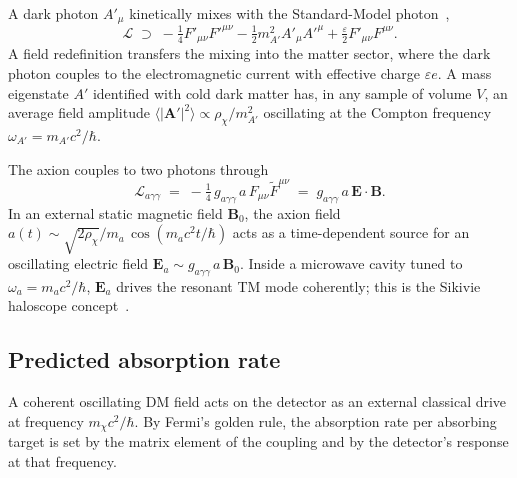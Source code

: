 \begin{statement}
\label{stmt:dark-photon}
A dark photon $A'_\mu$ kinetically mixes with the Standard-Model
photon~\cite{holdom1986},
\begin{equation}
\label{eq:dark-photon-L}
\mathcal{L}\;\supset\;-\tfrac{1}{4}F'_{\mu\nu}F'^{\mu\nu}-\tfrac12 m_{A'}^2 A'_\mu A'^\mu
+\tfrac{\varepsilon}{2}F'_{\mu\nu}F^{\mu\nu}.
\end{equation}
A field redefinition transfers the mixing into the matter sector,
where the dark photon couples to the electromagnetic current with
effective charge $\varepsilon e$. A mass eigenstate $A'$ identified
with cold dark matter has, in any sample of volume $V$, an average
field amplitude $\langle |\bm A'|^2\rangle\propto \rho_\chi/m_{A'}^2$
oscillating at the Compton frequency $\omega_{A'}=m_{A'}c^2/\hbar$.
\end{statement}

\begin{statement}
\label{stmt:axion}
The axion couples to two photons through
\begin{equation}
\label{eq:axion-L}
\mathcal{L}_{a\gamma\gamma} \;=\; -\tfrac14\,g_{a\gamma\gamma}\,a\,F_{\mu\nu}\tilde F^{\mu\nu}
\;=\; g_{a\gamma\gamma}\,a\,\bm{E}\!\cdot\!\bm{B}.
\end{equation}
In an external static magnetic field $\bm B_0$, the axion field
$a(t)\sim\sqrt{2\rho_\chi}/m_a\,\cos(m_a c^2 t/\hbar)$ acts as a
time-dependent source for an oscillating electric field
$\bm E_a\sim g_{a\gamma\gamma}\,a\,\bm B_0$. Inside a microwave
cavity tuned to $\omega_a=m_a c^2/\hbar$, $\bm E_a$ drives the
resonant TM mode coherently; this is the Sikivie haloscope
concept~\cite{sikivie1983}.
\end{statement}

\subsection{Predicted absorption rate}
\label{sec:absorption-rate}

\begin{phenomenon}
A coherent oscillating DM field acts on the detector as an external
classical drive at frequency $m_\chi c^2/\hbar$. By Fermi's golden
rule, the absorption rate per absorbing target is set by the matrix
element of the coupling and by the detector's response at that
frequency.
\end{phenomenon}

